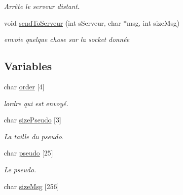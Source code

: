 \begin{DoxyCompactItemize}
\begin{DoxyCompactList}\small\item\em Arrête le serveur distant. \end{DoxyCompactList}\item 
void \hyperlink{group__client_ga79da17de173cd0d0da5d6e07e6e377f4}{send\+To\+Serveur} (int s\+Serveur, char $\ast$msg, int size\+Msg)
\begin{DoxyCompactList}\small\item\em envoie quelque chose sur la socket donnée \end{DoxyCompactList}\end{DoxyCompactItemize}
\subsection*{Variables}
\begin{DoxyCompactItemize}
\item 
\hypertarget{group__client_ga907c3a6256dd10a071ee545d4249825a}{}char \hyperlink{group__client_ga907c3a6256dd10a071ee545d4249825a}{order} \mbox{[}4\mbox{]}\label{group__client_ga907c3a6256dd10a071ee545d4249825a}

\begin{DoxyCompactList}\small\item\em l\textquotesingle{}ordre qui est envoyé. \end{DoxyCompactList}\item 
\hypertarget{group__client_ga076b5d65b30fabbb37beeb44450a5698}{}char \hyperlink{group__client_ga076b5d65b30fabbb37beeb44450a5698}{size\+Pseudo} \mbox{[}3\mbox{]}\label{group__client_ga076b5d65b30fabbb37beeb44450a5698}

\begin{DoxyCompactList}\small\item\em La taille du pseudo. \end{DoxyCompactList}\item 
\hypertarget{group__client_gae6cc99604162931ab8baf652f1a03682}{}char \hyperlink{group__client_gae6cc99604162931ab8baf652f1a03682}{pseudo} \mbox{[}25\mbox{]}\label{group__client_gae6cc99604162931ab8baf652f1a03682}

\begin{DoxyCompactList}\small\item\em Le pseudo. \end{DoxyCompactList}\item 
\hypertarget{group__client_ga86a8c1c1cd8fa6d69fa7558e34f915cf}{}char \hyperlink{group__client_ga86a8c1c1cd8fa6d69fa7558e34f915cf}{size\+Msg} \mbox{[}256\mbox{]}\label{group__client_ga86a8c1c1cd8fa6d69fa7558e34f915cf}


\end{DoxyCompactItemize}
